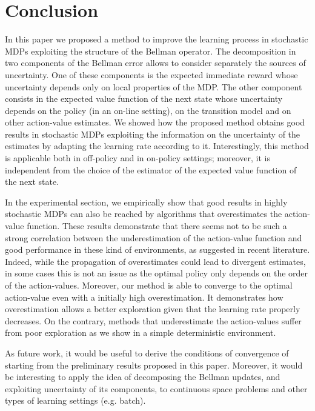 \documentclass[conference]{IEEEtran}
\begin{document}
\section{Conclusion}
In this paper we proposed a method to improve the learning process in stochastic MDPs exploiting the structure of the Bellman operator. The decomposition in two components of the Bellman error allows to consider separately the sources of uncertainty. One of these components is the expected immediate reward whose uncertainty depends only on local properties of the MDP. The other component consists in the expected value function of the next state whose uncertainty depends on the policy (in an on-line setting), on the transition model and on other action-value estimates. We showed how the proposed method obtains good results in stochastic MDPs exploiting the information on the uncertainty of the estimates by adapting the learning rate according to it. Interestingly, this method is applicable both in off-policy and in on-policy settings; moreover, it is independent from the choice of the estimator of the expected value function of the next state.

In the experimental section, we empirically show that good results in highly stochastic MDPs can also be reached by algorithms that overestimates the action-value function. These results demonstrate that there seems not to be such a strong correlation between the underestimation of the action-value function and good performance in these kind of environments, as suggested in recent literature. Indeed, while the propagation of overestimates could lead to divergent estimates, in some cases this is not an issue as the optimal policy only depends on the order of the action-values. Moreover, our method is able to converge to the optimal action-value even with a initially high overestimation. It demonstrates how overestimation allows a better exploration given that the learning rate properly decreases. On the contrary, methods that underestimate the action-values suffer from poor exploration as we show in a simple deterministic environment.

As future work, it would be useful to derive the conditions of convergence of \alg starting from the preliminary results proposed in this paper. Moreover, it would be interesting to apply the idea of decomposing the Bellman updates, and exploiting uncertainty of its components, to continuous space problems and other types of learning settings (e.g. batch).

\end{document}
